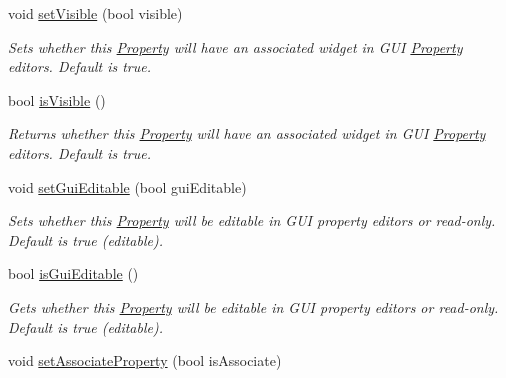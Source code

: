 \begin{DoxyCompactItemize}
void \hyperlink{class_picto_1_1_property_ad55eb788c4d635b92fa5944c78a1d346}{set\-Visible} (bool visible)
\begin{DoxyCompactList}\small\item\em Sets whether this \hyperlink{class_picto_1_1_property}{Property} will have an associated widget in G\-U\-I \hyperlink{class_picto_1_1_property}{Property} editors. Default is true. \end{DoxyCompactList}\item 
bool \hyperlink{class_picto_1_1_property_a05079b688854054f32897067f937a261}{is\-Visible} ()
\begin{DoxyCompactList}\small\item\em Returns whether this \hyperlink{class_picto_1_1_property}{Property} will have an associated widget in G\-U\-I \hyperlink{class_picto_1_1_property}{Property} editors. Default is true. \end{DoxyCompactList}\item 
\hypertarget{class_picto_1_1_property_a92f02255ef1c427035b1673d1251c9be}{void \hyperlink{class_picto_1_1_property_a92f02255ef1c427035b1673d1251c9be}{set\-Gui\-Editable} (bool gui\-Editable)}\label{class_picto_1_1_property_a92f02255ef1c427035b1673d1251c9be}

\begin{DoxyCompactList}\small\item\em Sets whether this \hyperlink{class_picto_1_1_property}{Property} will be editable in G\-U\-I property editors or read-\/only. Default is true (editable). \end{DoxyCompactList}\item 
\hypertarget{class_picto_1_1_property_adeb1e13bb14ed9e05697b0b79cbea0b8}{bool \hyperlink{class_picto_1_1_property_adeb1e13bb14ed9e05697b0b79cbea0b8}{is\-Gui\-Editable} ()}\label{class_picto_1_1_property_adeb1e13bb14ed9e05697b0b79cbea0b8}

\begin{DoxyCompactList}\small\item\em Gets whether this \hyperlink{class_picto_1_1_property}{Property} will be editable in G\-U\-I property editors or read-\/only. Default is true (editable). \end{DoxyCompactList}\item 
\hypertarget{class_picto_1_1_property_aca8c34b84eb4b8fcfb4011cf0b8fc359}{void \hyperlink{class_picto_1_1_property_aca8c34b84eb4b8fcfb4011cf0b8fc359}{set\-Associate\-Property} (bool is\-Associate)}\label{class_picto_1_1_property_aca8c34b84eb4b8fcfb4011cf0b8fc359}


\end{DoxyCompactItemize}
